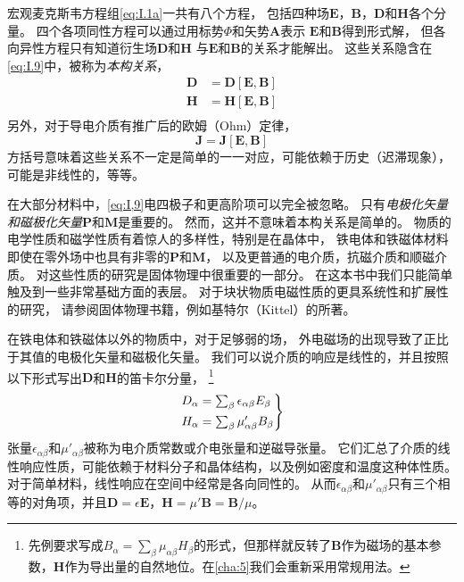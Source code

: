 \documentclass[12pt]{book}
\numberwithin{equation}{chapter}
\numberwithin{figure}{chapter}
\numberwithin{footnote}{page}
\begin{document}
宏观麦克斯韦方程组\autoref{eq:I.1a}一共有八个方程，
包括四种场$\mathbf{E}$，$\mathbf{B}$，$\mathbf{D}$和$\mathbf{H}$各个分量。
四个各项同性方程可以通过用标势$\Phi$和矢势$\mathbf{A}$表示
$\mathbf{E}$和$\mathbf{B}$得到形式解，
但各向异性方程只有知道衍生场$\mathbf{D}$和$\mathbf{H}$
与$\mathbf{E}$和$\mathbf{B}$的关系才能解出。
这些关系隐含在\autoref{eq:I.9}中，被称为\textit{本构关系}，
$$\begin{align}
    \mathbf{D}&=\mathbf{D}[\mathbf{E},\mathbf{B}]\\
    \mathbf{H}&=\mathbf{H}[\mathbf{E},\mathbf{B}]\\
\end{align}$$
另外，对于导电介质有推广后的欧姆（Ohm）定律，
$$\mathbf{J}=\mathbf{J}[\mathbf{E},\mathbf{B}]$$
方括号意味着这些关系不一定是简单的一一对应，可能依赖于历史（迟滞现象），可能是非线性的，等等。

在大部分材料中，\autoref{eq:I,9}电四极子和更高阶项可以完全被忽略。
只有\textit{电极化矢量和磁极化矢量}$\mathbf{P}$和$\mathbf{M}$是重要的。
然而，这并不意味着本构关系是简单的。
物质的电学性质和磁学性质有着惊人的多样性，特别是在晶体中，
铁电体和铁磁体材料即使在零外场中也具有非零的$\mathbf{P}$和$\mathbf{M}$，
以及更普通的电介质，抗磁介质和顺磁介质。
对这些性质的研究是固体物理中很重要的一部分。
在这本书中我们只能简单触及到一些非常基础方面的表层。
对于块状物质电磁性质的更具系统性和扩展性的研究，
请参阅固体物理书籍，例如基特尔（Kittel）的所著。

在铁电体和铁磁体以外的物质中，对于足够弱的场，
外电磁场的出现导致了正比于其值的电极化矢量和磁极化矢量。
我们可以说介质的响应是线性的，并且按照以下形式写出$\mathbf{D}$和$\mathbf{H}$的笛卡尔分量，
\footnote{先例要求写成$B_{\alpha}=\sum_{\beta}\mu_{\alpha\beta}H_{\beta}$的形式，但那样就反转了$\mathbf{B}$作为磁场的基本参数，$\mathbf{H}$作为导出量的自然地位。在\autoref{cha:5}我们会重新采用常规用法。}
\begin{equation}\label{eq:I.10}
    \begin{rcases*}
    D_{\alpha}=\sum_{\beta}\epsilon_{\alpha\beta}E_{\beta}\\
    H_{\alpha}=\sum_{\beta}\mu'_{\alpha\beta}B_{\beta}\\
    \end{rcases*}
\end{equation}
张量$\epsilon_{\alpha\beta}$和$\mu'_{\alpha\beta}$被称为电介质常数或介电张量和逆磁导张量。
它们汇总了介质的线性响应性质，可能依赖于材料分子和晶体结构，以及例如密度和温度这种体性质。
对于简单材料，线性响应在空间中经常是各向同性的。
从而$\epsilon_{\alpha\beta}$和$\mu'_{\alpha\beta}$只有三个相等的对角项，并且$\mathbf{D}=\epsilon\mathbf{E}$，$\mathbf{H}=\mu'\mathbf{B}=\mathbf{B}/\mu$。
\end{document}

